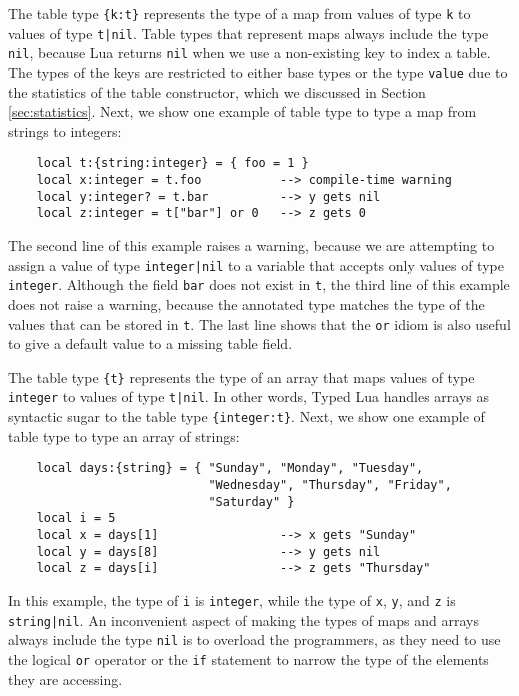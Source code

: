 The table type \texttt{\{k:t\}} represents the type of a map
from values of type \texttt{k} to values of type \texttt{t|nil}.
Table types that represent maps always include the type \texttt{nil},
because Lua returns \texttt{nil} when we use a non-existing key to
index a table. 
The types of the keys are restricted to either base types or the
type \texttt{value} due to the statistics of the table constructor,
which we discussed in Section \ref{sec:statistics}.
Next, we show one example of table type to type a map from strings to integers:
\begin{verbatim}
    local t:{string:integer} = { foo = 1 } 
    local x:integer = t.foo           --> compile-time warning
    local y:integer? = t.bar          --> y gets nil
    local z:integer = t["bar"] or 0   --> z gets 0 
\end{verbatim}

The second line of this example raises a warning, because we are
attempting to assign a value of type \texttt{integer|nil} to a
variable that accepts only values of type \texttt{integer}.
Although the field \texttt{bar} does not exist in \texttt{t}, the third
line of this example does not raise a warning, because the
annotated type matches the type of the values that can be stored in
\texttt{t}.
The last line shows that the \texttt{or} idiom is also useful to
give a default value to a missing table field.

The table type \texttt{\{t\}} represents the type of an array that 
maps values of type \texttt{integer} to values of type \texttt{t|nil}.
In other words, Typed Lua handles arrays as syntactic sugar to the
table type \texttt{\{integer:t\}}.
Next, we show one example of table type to type an array of strings:
\begin{verbatim}
    local days:{string} = { "Sunday", "Monday", "Tuesday",
                            "Wednesday", "Thursday", "Friday",
                            "Saturday" }
    local i = 5
    local x = days[1]                 --> x gets "Sunday"
    local y = days[8]                 --> y gets nil
    local z = days[i]                 --> z gets "Thursday"
\end{verbatim}

In this example, the type of \texttt{i} is \texttt{integer},
while the type of \texttt{x}, \texttt{y}, and \texttt{z} is
\texttt{string|nil}.
An inconvenient aspect of making the types of maps and arrays always
include the type \texttt{nil} is to overload the programmers,
as they need to use the logical \texttt{or} operator or the \texttt{if}
statement to narrow the type of the elements they are accessing.

